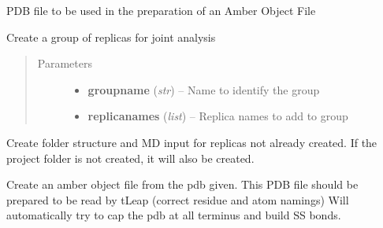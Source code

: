 \documentclass[letterpaper,10pt,english]{sphinxmanual}
\begin{document}
\begin{fulllineitems}

\begin{fulllineitems}
\label{project:pyMDMix.Project.Project.amberPDB}
PDB file to be used in the preparation of an Amber Object File

\end{fulllineitems}


\begin{fulllineitems}
\label{project:pyMDMix.Project.Project.createGroup}
Create a group of replicas for joint analysis
\begin{quote}\begin{description}
\item[{Parameters}] \leavevmode\begin{itemize}
\item {} 
\textbf{groupname} (\emph{str}) -- Name to identify the group

\item {} 
\textbf{replicanames} (\emph{list}) -- Replica names to add to group

\end{itemize}

\end{description}\end{quote}

\end{fulllineitems}


\begin{fulllineitems}
\label{project:pyMDMix.Project.Project.createNewReplicas}
Create folder structure and MD input for replicas not already created.
If the project folder is not created, it will also be created.

\end{fulllineitems}


\begin{fulllineitems}
\label{project:pyMDMix.Project.Project.createOFFFromPDB}
Create an amber object file from the pdb given.
This PDB file should be prepared to be read by tLeap (correct residue and atom namings)
Will automatically try to cap the pdb at all terminus and build SS bonds.


\end{fulllineitems}
\end{fulllineitems}
\end{document}
